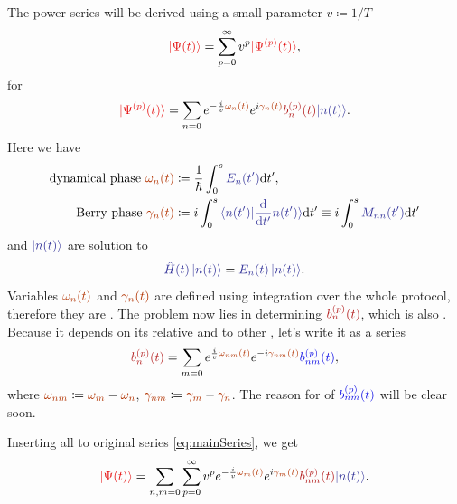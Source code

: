 The power series will be derived using a small parameter $v\coloneqq 1/T$
\begin{equation}
    \red{\ket{\Psi(t)}}=\sum_{p=0}^\infty v^p \red{\ket{\Psi^{(p)}(t)}},
    \label{eq:mainSeries}
\end{equation}
for 
\begin{equation}
    \red{\ket{\Psi^{(p)}(t)}}=\sum_{n=0} e^{-\frac{i}{v} \reddd{\omega_n(t)}}e^{i\reddd{\gamma_n(t)}}\redd{b_n^{(p)}(t)}\bluee{\ket{n(t)}}.
\end{equation}
Here we have
\begin{align}
    \text{dynamical phase }\reddd{\omega_n(t)} &\coloneqq \frac{1}{\hbar}\int_0^s \bluee{E_n(t')}\d t',\\
    \text{Berry phase }\reddd{\gamma_n(t)} &\coloneqq i\int_0^s \bluee{\braket{n(t')|\frac{\d}{\d t'}n(t')}}\d t' \equiv i\int_0^s \bluee{M_{nn}(t')}\d t'
    \label{eq:gammadef}
\end{align}
and $\bluee{\ket{n(t)}}$ are solution to
\begin{equation}
    \bluee{\HH(t)\ket{n(t)}}=\bluee{E_n(t) \ket{n(t)}}.
\end{equation}
Variables $\reddd{\omega_n(t)}$ and $\reddd{\gamma_n(t)}$ are defined using integration over the whole protocol, therefore they are \emph{}.
The problem now lies in determining $\redd{b_n^{(p)}(t)}$, which is also . Because it depends on its relative  and  to other , let's write it as a series
\begin{equation}
    \redd{b_n^{(p)}(t)}=\sum_{m=0} e^{\frac{i}{v}\reddd{\omega_{nm}(t)}}e^{-i\reddd{\gamma_{nm}(t)}}\blue{b_{nm}^{(p)}(t)},
    \label{eq:bnAPT}
\end{equation}
where $\reddd{\omega_{nm}} \coloneqq \reddd{\omega_m}-\reddd{\omega_n}$, $\reddd{\gamma_{nm}} \coloneqq \reddd{\gamma_m}-\reddd{\gamma_n}$.  The reason for  of $\blue{b_{nm}^{(p)}(t)}$ will be clear soon.

Inserting all to original series \ref{eq:mainSeries}, we get
\begin{equation}
    \red{\ket{\Psi(t)}}=\sum_{n,m=0}\sum_{p=0}^\infty v^p e^{-\frac{i}{v}\reddd{\omega_m(t)}}e^{i\reddd{\gamma_m(t)}}\redd{b_{nm}^{(p)}(t)}\bluee{\ket{n(t)}}.
    \label{eq:solve0}
\end{equation}

